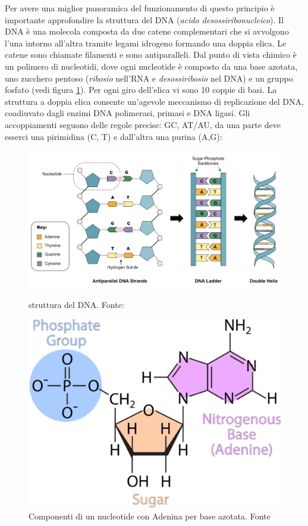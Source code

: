 \par Per avere una miglior panoramica del funzionamento di questo principio è importante approfondire la struttura del DNA (\textit{acido desossiribonucleico}). Il DNA è una molecola composta da due catene complementari che si avvolgono l'una intorno all'altra tramite legami idrogeno formando una doppia elica. Le catene sono chiamate filamenti e sono antiparalleli. Dal punto di vista chimico è un polimero di nucleotidi, dove ogni nucleotide è composto da una base azotata, uno zucchero pentoso (\textit{ribosio} nell'RNA e \textit{desossiribosio} nel DNA) e un gruppo fosfato (vedi figura \ref{fig:nucleotide}). Per ogni giro dell'elica vi sono 10 coppie di basi. La struttura a doppia elica consente un'agevole meccanismo di replicazione del DNA, coadiuvato dagli enzimi DNA polimerasi, primasi e DNA ligasi. Gli accoppiamenti seguono delle regole precise: GC, AT/AU, da una parte deve esserci una pirimidina (C, T) e dall'altra una purina (A,G):

\begin{figure}[!htb]
	\includegraphics[scale=0.25]{images/double-stranded-dna_med.jpeg}
	\caption{struttura del DNA. Fonte: \cite{dna-image}}
	\label{fig:dna}
	\endminipage\hfill
	\includegraphics[scale=0.3]{images/nucleotide.png}
	\caption{Componenti di un nucleotide con Adenina per base azotata. Fonte \cite{introChimicaLibreTexts}}
	\label{fig:nucleotide}
	\endminipage\hfill
\end{figure}


